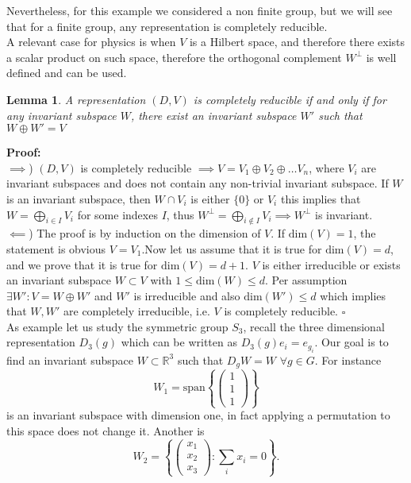 \documentclass[12pt]{book}
\theoremstyle{plain}
\newcommand{\R}{\mathbb{R}}
\newcommand{\x}{\mathbf{x}}
\newtheorem{lem}[thm]{Lemma}
\theoremstyle{definition}
\theoremstyle{remark}
\begin{document}
Nevertheless, for this example we considered a non finite group, but we will see that for a finite group, any representation is completely reducible. \\
A relevant case for physics is when $V$ is a Hilbert space, and therefore there exists a scalar product on such space, therefore the orthogonal complement $W^\perp$ is well defined and can be used.
\begin{lem}
A representation $(D,V)$ is completely reducible if and only if for any invariant subspace $W$, there exist an invariant subspace $W'$ such that $W\oplus W' = V$
\end{lem}
\hspace{-1.4em}\textbf{Proof:}\\
$\implies$) $(D,V)$ is completely reducible $\implies V= V_1\oplus V_2\oplus \dots V_n$, where $V_i$ are invariant subspaces and does not contain any non-trivial invariant subspace. If $W$ is an invariant subspace, then $W\cap V_i$ is either $\{0\}$ or $V_i$ this implies that $W = \bigoplus_{i\in I} V_i$ for some indexes $I$, thus $W^\perp = \bigoplus_{i\notin I} V_i \implies W^\perp$ is invariant.\\
$\impliedby$) The proof is by induction on the dimension of $V$. If $\text{dim}(V) = 1$, the statement is obvious $V= V_1$.Now let us assume that it is true for $\text{dim}(V) = d$, and we prove that it is true for $\text{dim}(V) = d+1$. $V$ is either irreducible or exists an invariant subspace $W\subset V$ with $1\leq \text{dim}(W)\leq d$. Per assumption $\exists W' : V = W\oplus W'$ and $W'$ is irreducible and also $\text{dim}(W') \leq d$ which implies that $W,W'$ are completely irreducible, i.e. $V$ is completely reducible. \hfill\ensuremath{\square}\\
As example let us study the symmetric group $S_3$, recall the three dimensional representation $D_3(g)$ which can be written as $D_3(g)e_i = e_{g_i}$. Our goal is to find an invariant subspace $W\subset \R^3$ such that $D_g W = W$ $\forall g\in G$. For instance
\[W_1 = \text{span}\left\{\begin{pmatrix}1\\1\\1\end{pmatrix}\right\}\]
is an invariant subspace with dimension one, in fact applying a permutation to this space does not change it. Another is 
\[W_2 = \left\{\begin{pmatrix}x_1\\x_2\\x_3\end{pmatrix}:\sum_i x_i = 0\right\}.\]
\end{document}
